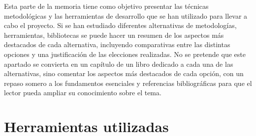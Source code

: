 
Esta parte de la memoria tiene como objetivo presentar las técnicas metodológicas y las herramientas de desarrollo que se han utilizado para llevar a cabo el proyecto. Si se han estudiado diferentes alternativas de metodologías, herramientas, bibliotecas se puede hacer un resumen de los aspectos más destacados de cada alternativa, incluyendo comparativas entre las distintas opciones y una justificación de las elecciones realizadas. 
No se pretende que este apartado se convierta en un capítulo de un libro dedicado a cada una de las alternativas, sino comentar los aspectos más destacados de cada opción, con un repaso somero a los fundamentos esenciales y referencias bibliográficas para que el lector pueda ampliar su conocimiento sobre el tema.

\section*{Herramientas utilizadas}

